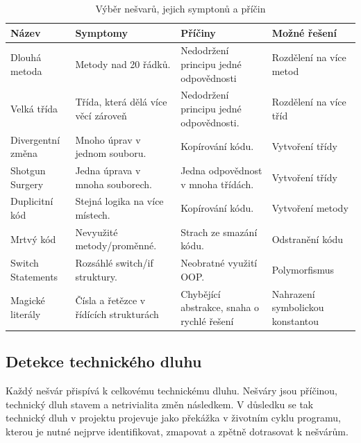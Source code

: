 \documentclass[FM,DP,fonts]{tulthesis}
\begin{document}
\begin{table}[H]
	\centering
	\caption{Výběr nešvarů, jejich symptonů a příčin}
	\label{tab:code_smells_detailed}
	\footnotesize
	\begin{tabularx}{\textwidth}{@{} p{} X X X @{}}
		\toprule
		\textbf{Název}    & \textbf{Symptomy}                      & \textbf{Příčiny}                           & \textbf{Možné řešení}            \\ \midrule
		Dlouhá metoda     & Metody nad 20 řádků.                   & Nedodržení principu jedné odpovědnosti     & Rozdělení na více metod          \\ \midrule
		Velká třída       & Třída, která dělá více věcí zároveň    & Nedodržení principu jedné odpovědnosti.    & Rozdělení na více tříd           \\ \midrule
		Divergentní změna & Mnoho úprav v jednom souboru.          & Kopírování kódu.                           & Vytvoření třídy                  \\ \midrule
		Shotgun Surgery   & Jedna úprava v mnoha souborech.        & Jedna odpovědnost v mnoha třídách.         & Vytvoření třídy                  \\ \midrule
		Duplicitní kód    & Stejná logika na více místech.         & Kopírování kódu.                           & Vytvoření metody                 \\ \midrule
		Mrtvý kód         & Nevyužité metody/proměnné.             & Strach ze smazání kódu.                    & Odstranění kódu                  \\ \midrule
		Switch Statements & Rozsáhlé switch/if struktury.          & Neobratné využití OOP.                     & Polymorfismus                    \\
		\midrule
		Magické literály  & Čísla a řetězce v řídících strukturách & Chybějící abstrakce, snaha o rychlé řešení & Nahrazení symbolickou konstantou \\
		\bottomrule
	\end{tabularx}
\end{table}
\subsection{Detekce technického dluhu}
Každý nešvár přispívá k celkovému technickému dluhu. Nešváry jsou příčinou, technický dluh stavem a netrivialita změn následkem. V důsledku se tak technický dluh v projektu projevuje jako překážka v životním cyklu programu, kterou je nutné nejprve identifikovat, zmapovat a zpětně dotrasovat k nešvárům.
\end{document}
